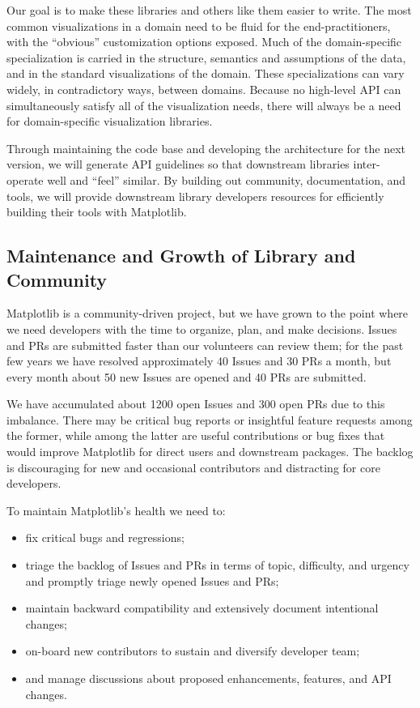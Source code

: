 \documentclass[11pt,letterpaper]{article}  %
\begin{document}
Our goal is to make these libraries and others like them easier to write. The most common visualizations in a domain need to be fluid for the end-practitioners, with the ``obvious'' customization options exposed. Much of the domain-specific specialization is carried in the structure, semantics and assumptions of the data, and in the standard visualizations of the domain. These specializations can vary widely, in contradictory ways, between domains. Because no high-level API can simultaneously satisfy all of the visualization needs, there will always be a need for domain-specific visualization libraries.

Through maintaining the code base and developing the architecture for the next version, we will generate API guidelines so that downstream libraries inter-operate well and ``feel'' similar. By building out community, documentation, and tools, we will provide downstream library developers resources for efficiently building their tools with Matplotlib.

\subsection{Maintenance and Growth of Library and Community}

Matplotlib is a community-driven project, but we have grown to the point where we need developers with the time to organize, plan, and make decisions. Issues and PRs are submitted faster than our volunteers can
review them; for the past few years we have resolved approximately 40 Issues and 30 PRs a month, but every month about 50 new Issues are opened and 40 PRs are submitted.

We have accumulated about 1200 open Issues and 300 open PRs due to this imbalance. There may be critical bug reports or insightful feature requests among the former, while among the latter are useful contributions or bug fixes that would improve Matplotlib for direct users and downstream packages. The backlog is discouraging for new and occasional contributors and distracting for core developers.

To maintain Matplotlib's health we need to:
\begin{itemize}[noitemsep]
\item fix critical bugs and regressions;
\item triage the backlog of Issues and PRs in terms of topic, difficulty, and urgency and promptly triage newly opened Issues and PRs;
\item maintain backward compatibility and extensively document intentional changes;
\item on-board new contributors to sustain and diversify developer team;
\item and manage discussions about proposed enhancements, features, and API changes.
\end{itemize}
\end{document}
